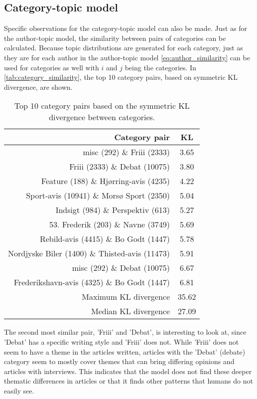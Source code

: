 \subsection{Category-topic model}\label{sec:discussion_category_topic} 
Specific observations for the category-topic model can also be made.
Just as for the author-topic model, the similarity between pairs of categories can be calculated.
Because topic distributions are generated for each category, just as they are for each author in the author-topic model \autoref{eq:author_similarity} can be used for categories as well with $i$ and $j$ being the categories.
In \autoref{tab:category_similarity}, the top 10 category pairs, based on symmetric KL divergence, are shown.

\begin{table}[h]
	\centering
	\caption{Top 10 category pairs based on the symmetric KL divergence between categories.}
	\begin{tabular}{r|c}
		Category pair & KL \\
		\midrule
		misc (292) \& Friii (2333) & 3.65 \\
		Friii (2333) \& Debat (10075) & 3.80 \\
		Feature (188) \& Hjørring-avis (4235) & 4.22 \\
		Sport-avis (10941) \& Morsø Sport (2350) & 5.04 \\
		Indsigt (984) \& Perspektiv (613) & 5.27 \\
		53. Frederik (203) \& Navne (3749) & 5.69 \\
		Rebild-avis (4415) \& Bo Godt (1447) & 5.78 \\
		Nordjyske Biler (1400) \& Thisted-avis (11473) & 5.91 \\
		misc (292) \& Debat (10075) & 6.67 \\
		Frederikshavn-avis (4325) \& Bo Godt (1447) & 6.81 \\
		\midrule
		Maximum KL divergence & 35.62 \\
		Median KL divergence & 27.09 \\
	\end{tabular}
	\label{tab:category_similarity}
\end{table}

The second most similar pair, 'Friii' and 'Debat', is interesting to look at, since 
'Debat' has a specific writing style and 'Friii' does not.
While 'Friii' does not seem to have a theme in the articles written, articles with the 'Debat' (debate) category seem to mostly cover themes that can bring differing opinions and articles with interviews.
This indicates that the model does not find these deeper thematic differences in articles or that it finds other patterns that humans do not easily see.

